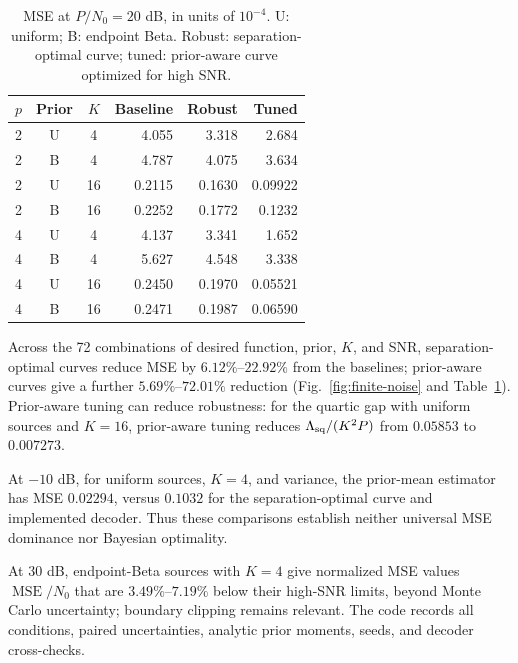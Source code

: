 \begin{table}[t]
\caption{MSE at $P/N_0=20$ dB, in units of $10^{-4}$. U: uniform; B: endpoint Beta. Robust: separation-optimal curve; tuned: prior-aware curve optimized for high SNR.}
\label{tab:finite-noise}
\centering\small
\begin{tabular}{@{}cccrrr@{}}\toprule
$p$ & Prior & $K$ & Baseline & Robust & Tuned\\\midrule
2 & U & 4  & 4.055 & 3.318 & 2.684\\
2 & B & 4  & 4.787 & 4.075 & 3.634\\
2 & U & 16 & 0.2115 & 0.1630 & 0.09922\\
2 & B & 16 & 0.2252 & 0.1772 & 0.1232\\
4 & U & 4  & 4.137 & 3.341 & 1.652\\
4 & B & 4  & 5.627 & 4.548 & 3.338\\
4 & U & 16 & 0.2450 & 0.1970 & 0.05521\\
4 & B & 16 & 0.2471 & 0.1987 & 0.06590\\\bottomrule
\end{tabular}
\end{table}

Across the 72 combinations of desired function, prior, $K$, and SNR, separation-optimal curves reduce MSE by $6.12\%$--$22.92\%$ from the baselines; prior-aware curves give a further $5.69\%$--$72.01\%$ reduction (Fig.~\ref{fig:finite-noise} and Table~\ref{tab:finite-noise}). Prior-aware tuning can reduce robustness: for the quartic gap with uniform sources and $K=16$, prior-aware tuning reduces $\Lambda_{\mathrm{sq}}/(K^2P)$ from $0.05853$ to $0.007273$.

At $-10$ dB, for uniform sources, $K=4$, and variance, the prior-mean estimator has MSE $0.02294$, versus $0.1032$ for the separation-optimal curve and implemented decoder. Thus these comparisons establish neither universal MSE dominance nor Bayesian optimality.

At $30$ dB, endpoint-Beta sources with $K=4$ give normalized MSE values $\operatorname{MSE}/N_0$ that are $3.49\%$--$7.19\%$ below their high-SNR limits, beyond Monte Carlo uncertainty; boundary clipping remains relevant. The code records all conditions, paired uncertainties, analytic prior moments, seeds, and decoder cross-checks.
